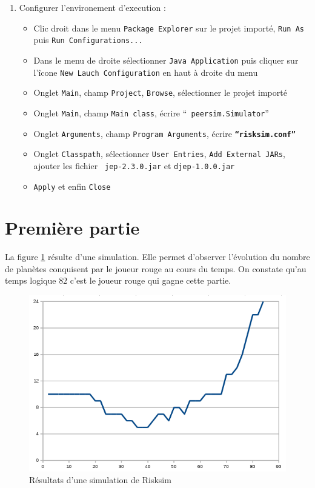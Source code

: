 \documentclass{article}
\begin{document}
\begin{enumerate}
      \item
        Configurer l'environement d'execution :
        \begin{itemize}
          \item Clic droit dans le menu {\tt Package Explorer} sur le projet
            importé, {\tt Run As} puis {\tt Run Configurations...}
          \item Dans le menu de droite sélectionner {\tt Java Application}
            puis cliquer sur l'îcone {\tt New Lauch Configuration} en haut à
            droite du menu
          \item Onglet {\tt Main}, champ {\tt Project}, {\tt Browse},
            sélectionner le projet importé
          \item Onglet {\tt Main}, champ {\tt Main class}, écrire ``{\tt
            peersim.Simulator}''
          \item Onglet {\tt Arguments}, champ {\tt Program Arguments},
            écrire {\tt\bf ``risksim.conf''}
          \item Onglet {\tt Classpath}, sélectionner {\tt User Entries},
            {\tt Add External JARs}, ajouter les fichier {\tt
              jep-2.3.0.jar} et {\tt djep-1.0.0.jar}
          \item {\tt Apply} et enfin {\tt Close}
        \end{itemize}
    \end{enumerate}

  \section*{Première partie}

    La figure \ref{fig:simul} résulte d'une simulation. Elle permet d'observer
    l'évolution du nombre de planètes conquisent par le joueur rouge au cours du
    temps. On constate qu'au temps logique $82$ c'est le joueur rouge qui
    gagne cette partie.

    \begin{figure}[h]
      \centering
      \includegraphics[width=\textwidth]{img/simul.png}
      \caption{Résultats d'une simulation de Risksim}
      \label{fig:simul}
    \end{figure}
\end{document}
